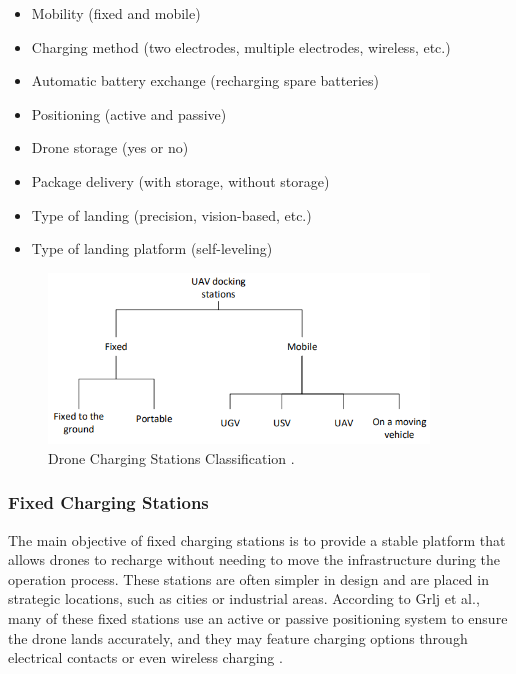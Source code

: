     \begin{itemize}
        \item Mobility (fixed and mobile)
        \item Charging method (two electrodes, multiple electrodes, wireless, etc.)
        \item Automatic battery exchange (recharging spare batteries)
        \item Positioning (active and passive)
        \item Drone storage (yes or no)
        \item Package delivery (with storage, without storage)
        \item Type of landing (precision, vision-based, etc.)
        \item Type of landing platform (self-leveling)
    \end{itemize}

    \begin{figure}[H]
        \centering
        \includegraphics[width=0.9\textwidth]{pictures/charging_classification.png}
        \caption{Drone Charging Stations Classification \cite{grlj_docking_stations}.}
        \label{fig:charging_classification}
    \end{figure}

\subsubsection{Fixed Charging Stations}

    The main objective of fixed charging stations is to provide a stable platform that allows drones to recharge without needing to move the infrastructure during the operation process. These stations are often simpler in design and are placed in strategic locations, such as cities or industrial areas. According to Grlj et al., many of these fixed stations use an active or passive positioning system to ensure the drone lands accurately, and they may feature charging options through electrical contacts or even wireless charging \cite{grlj_docking_stations}.

